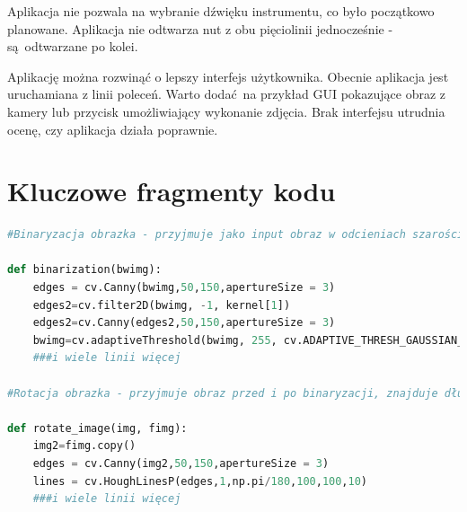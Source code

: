 \documentclass[12pt]{article}
\begin{document}
Aplikacja nie pozwala na wybranie dźwięku instrumentu, co było początkowo planowane. Aplikacja nie odtwarza nut z obu pięciolinii jednocześnie - są odtwarzane po kolei.
	
Aplikację można rozwinąć o lepszy interfejs użytkownika. Obecnie aplikacja jest uruchamiana z linii poleceń. Warto dodać na przykład GUI pokazujące obraz z kamery lub przycisk umożliwiający wykonanie zdjęcia. Brak interfejsu utrudnia ocenę, czy aplikacja działa poprawnie.

\section{Kluczowe fragmenty kodu}
\begin{lstlisting}[language=Python]
#Binaryzacja obrazka - przyjmuje jako input obraz w odcieniach szarości, zwraca obraz czarno biały z uwypuklonymi ciemniejszymi niż tło obszarami. Opiera się na kompletnym zaciemnieniu obszarów, wokół których kolor nigdy się nie zmienia i standardowej binaryzacji dla pozostałych obszarów obrazka

def binarization(bwimg):
	edges = cv.Canny(bwimg,50,150,apertureSize = 3)
	edges2=cv.filter2D(bwimg, -1, kernel[1])
	edges2=cv.Canny(edges2,50,150,apertureSize = 3)
	bwimg=cv.adaptiveThreshold(bwimg, 255, cv.ADAPTIVE_THRESH_GAUSSIAN_C, cv.THRESH_BINARY, Hypers['Binarization_conn'], 1)
	###i wiele linii więcej

#Rotacja obrazka - przyjmuje obraz przed i po binaryzacji, znajduje długie linie na oryginalnym obrazku po czym w zależności od tego, jaki jest w przybliżeniu do 1.8 stopni najczęściej występujący kąt linii, obraca obrazek tak, aby linie znajdujące się pod tym kątem leżały poziomo do obrazka

def rotate_image(img, fimg):
	img2=fimg.copy()
	edges = cv.Canny(img2,50,150,apertureSize = 3)
	lines = cv.HoughLinesP(edges,1,np.pi/180,100,100,10)
	###i wiele linii więcej
	
\end{lstlisting}
\end{document}
